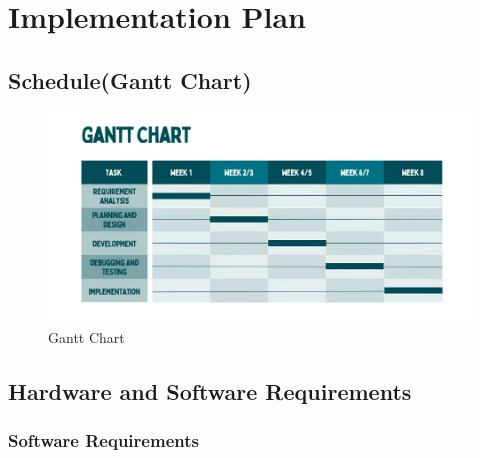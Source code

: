 \chapter{Implementation Plan}


\section{Schedule(Gantt Chart)}
	
	\begin{figure}[h]
	 \centering
	\includegraphics[scale=1]{images/Gyant_chart.png}
	\caption{ Gantt Chart}
	
	\end{figure}
	
	\pagebreak
	\section{Hardware and Software Requirements}
	\subsection{Software Requirements}

